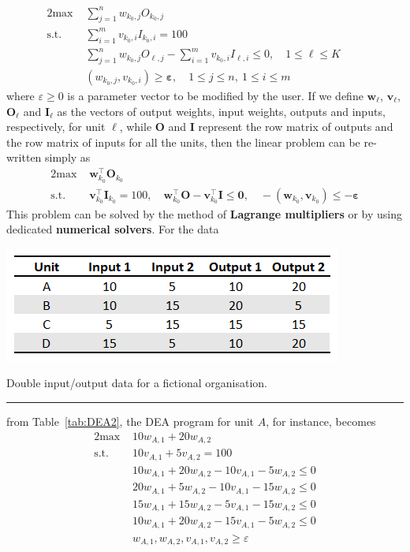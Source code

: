   \begin{alignat*}{2}
    \text{max }   & \sum_{j=1}^n w_{k_0,j}O_{k_0,j} & &\  \\
    \text{s.t. } & \sum_{i=1}^m v_{k_0,i}I_{k_0,i} = 100 &\ & \\
                       & \sum_{j=1}^n w_{k_0,j}O_{\ell,j}-\sum_{i=1}^m v_{k_0,i}I_{\ell,i}\leq 0,\quad 1\leq \ell\leq K\\
                       & (w_{k_0,j},v_{k_0,i})\geq \mathbf{\varepsilon},\quad 1\leq j\leq n,\ 1\leq i\leq m &
  \end{alignat*}
  where $\varepsilon\geq 0$ is a parameter vector to be modified by the user. If we define $\mathbf{w}_{\ell}$,  $\mathbf{v}_{\ell}$, $\mathbf{O}_{\ell}$ and $\mathbf{I}_{\ell}$  as the vectors of output weights, input weights, outputs and inputs, respectively, for unit $\ell$, while $\mathbf{O}$ and $\mathbf{I}$ represent the row matrix of outputs and the row matrix of inputs for all the units, then the linear problem can be re-written simply as   
   \begin{alignat*}{2}
    \text{max }   & \mathbf{w}_{k_0}^{\!\top}\mathbf{O}_{k_0} \  \\
    \text{s.t. } & \mathbf{v}_{k_0}^{\!\top}\mathbf{I}_{k_0} = 100 ,\quad  \mathbf{w}_{k_0}^{\!\top}\mathbf{O}-\mathbf{v}_{k_0}^{\!\top}\mathbf{I}\leq \mathbf{0}, \quad -\left(\mathbf{w}_{k_0},\mathbf{v}_{k_0}\right)\leq -\mathbf{\varepsilon}  
  \end{alignat*} 
  This problem can be solved by the method of \textbf{Lagrange multipliers} or by using dedicated \textbf{numerical solvers}. \newl For the data 
\begin{table}[t]
  \begin{center}
    \includegraphics{images/OPT/DEA2}
  \end{center}
  \caption{\small Double input/output data for a fictional organisation.}\hrule
  \label{tab:DEA2}
\end{table}
  from Table~\ref{tab:DEA2}, the DEA program for unit $A$, for instance, becomes
  \begin{alignat*}{2}
    \text{max }   & 10w_{A,1}+20w_{A,2} \\
    \text{s.t. } & 10v_{A,1}+5v_{A,2} = 100 \\
                       & 10w_{A,1}+20w_{A,2}-10v_{A,1}-5w_{A,2}\leq 0 \\
                       & 20w_{A,1}+5w_{A,2}-10v_{A,1}-15w_{A,2}\leq 0 \\
                       & 15w_{A,1}+15w_{A,2}-5v_{A,1}-15w_{A,2}\leq 0 \\
                       & 10w_{A,1}+20w_{A,2}-15v_{A,1}-5w_{A,2}\leq 0 \\
                       & w_{A,1},w_{A,2},v_{A,1},v_{A,2}\geq \varepsilon
  \end{alignat*}

